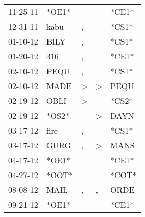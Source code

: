 \begin{supertabular}{p{0.07\textwidth}p{0.06\textwidth}p{0.02\textwidth}p{0.02\textwidth}p{0.06\textwidth}}
          11-25-11\textsuperscript{} &                            *OE1* &                  &                  &                            *CE1* \\
          12-31-11\textsuperscript{} &           kabu\textsuperscript{} &                , &                  &                            *CS1* \\
          01-10-12\textsuperscript{} &           BILY\textsuperscript{} &                , &                  &                            *CS1* \\
          01-20-12\textsuperscript{} &            316\textsuperscript{} &                , &                  &                            *CE1* \\
          02-10-12\textsuperscript{} &           PEQU\textsuperscript{} &                , &                  &                            *CS1* \\
          02-10-12\textsuperscript{} &           MADE\textsuperscript{} &     \textgreater &     \textgreater &           PEQU\textsuperscript{} \\
          02-19-12\textsuperscript{} &           OBLI\textsuperscript{} &     \textgreater &                  &                            *CS2* \\
          02-19-12\textsuperscript{} &                            *OS2* &                  &     \textgreater &           DAYN\textsuperscript{} \\
          03-17-12\textsuperscript{} &           fire\textsuperscript{} &                , &                  &                            *CS1* \\
          03-17-12\textsuperscript{} &           GURG\textsuperscript{} &                , &     \textgreater &           MANS\textsuperscript{} \\
          04-17-12\textsuperscript{} &                            *OE1* &                  &                  &                            *CE1* \\
          04-27-12\textsuperscript{} &                            *OOT* &                  &                  &                            *COT* \\
          08-08-12\textsuperscript{} &           MAIL\textsuperscript{} &                , &                , &           ORDE\textsuperscript{} \\
          09-21-12\textsuperscript{} &                            *OE1* &                  &                  &                            *CE1* \\

\end{supertabular}
